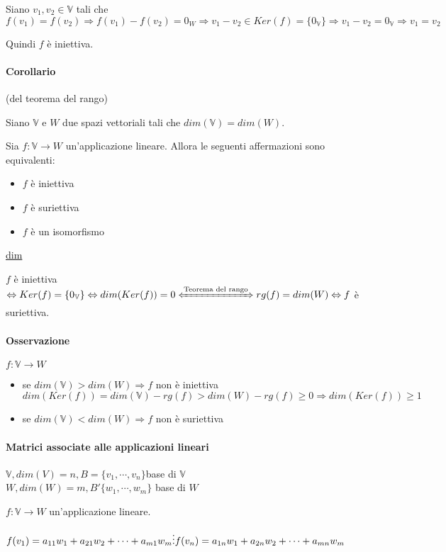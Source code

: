 \documentclass{article}
\newcommand{\ul}[1]{\underline{#1}}
\newcommand{\V}{\mathbb{V}}
\begin{document}
Siano $v_1,v_2\in\V$ tali che $f(v_1)=f(v_2)\Rightarrow f(v_1)-f(v_2)=0_W\Rightarrow v_1-v_2\in Ker(f)=\{0_\V\}\Rightarrow v_1-v_2=0_\V\Rightarrow v_1=v_2$

Quindi $f$ è iniettiva.

\paragraph{Corollario} (del teorema del rango)

Siano $\V$ e $W$ due spazi vettoriali tali che $dim(\V)=dim(W)$.

Sia $f:\V\rightarrow W$ un'applicazione lineare. Allora le seguenti affermazioni sono equivalenti:
\begin{itemize}
	\item $f$ è iniettiva
	\item $f$ è suriettiva
	\item $f$ è un isomorfismo
\end{itemize}

\ul{dim}

$f$ è iniettiva $\Leftrightarrow Ker(f)=\{0_\V\}\Leftrightarrow dim(Ker(f))=0\xLeftrightarrow{\text{Teorema del rango}}rg(f)=dim(W)\Leftrightarrow f$ è suriettiva.

\paragraph{Osservazione}

$f:\V\rightarrow W$
\begin{itemize}
	\item se $dim(\V)>dim(W)\Rightarrow f$ non è iniettiva\\
		$dim(Ker(f))=dim(\V)-rg(f)>dim(W)-rg(f)\ge0\Rightarrow dim(Ker(f))\ge1$
	\item se $dim(\V)<dim(W)\Rightarrow f$ non è suriettiva
\end{itemize}

\paragraph{Matrici associate alle applicazioni lineari}

$\V,dim(V)=n,B=\{v_1,\cdots,v_n\}$base di $\V$\\$W,dim(W)=m,B'\{w_1,\cdots,w_m\}$ base di $W$

$f:\V\rightarrow W$ un'applicazione lineare.

$f(v_1)=a_{11}w_1+a_{21}w_2+\cdots+a_{m1}w_m\\
\vdots\\
f(v_n)=a_{1n}w_1+a_{2n}w_2+\cdots+a_{mn}w_m$
\end{document}
